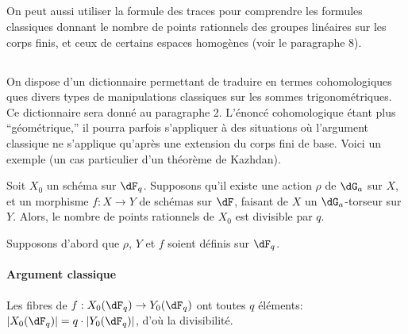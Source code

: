 \subsection{}\label{VI:1-11}

On peut aussi utiliser la formule des traces pour comprendre les formules 
classiques donnant le nombre de points rationnels des groupes linéaires sur 
les corps finis, et ceux de certains espaces homogènes (voir le paragraphe 
8). 





\subsection{}\label{VI:1-12}

On dispose d'un dictionnaire permettant de traduire en termes cohomologiques 
ques divers types de manipulations classiques sur les sommes 
trigonométriques. Ce dictionnaire sera donné au paragraphe 2. L'énoncé 
cohomologique étant plus ``géométrique,'' il pourra parfois s'appliquer 
à des situations où l'argument classique ne s'applique qu'après une 
extension du corps fini de base. Voici un exemple (un cas particulier d'un 
théorème de Kazhdan). 





\begin{theorem_}[Kazhdan]\label{VI:1-13}
Soit $X_0$ un schéma sur $\dF_q$. Supposons qu'il existe une action $\rho$ de 
$\dG_a$ sur $X$, et un morphisme $f:X\to Y$ de schémas sur $\dF$, faisant de 
$X$ un $\dG_a$-torseur sur $Y$. Alors, le nombre de points rationnels de $X_0$ 
est divisible par $q$.
\end{theorem_}

Supposons d'abord que $\rho$, $Y$ et $f$ soient définis sur $\dF_q$. 


\paragraph{Argument classique}
Les fibres de $f:X_0(\dF_q)\to Y_0(\dF_q)$ ont toutes $q$ éléments: 
$|X_0(\dF_q)| = q\cdot |Y_0(\dF_q)|$, d'où la divisibilité. 


